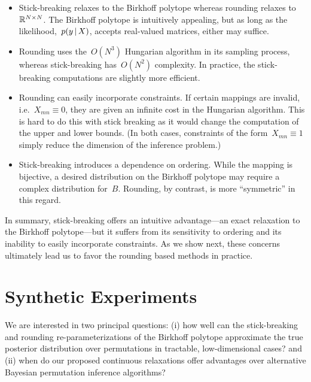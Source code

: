 \documentclass[twoside]{article}
\begin{document}
\begin{itemize}
\item Stick-breaking relaxes to the Birkhoff polytope whereas rounding
  relaxes to~$\mathbb{R}^{N \times N}$. The Birkhoff polytope is
  intuitively appealing, but as long as the
  likelihood,~$p(y \, | \, X)$, accepts real-valued matrices, either
  may suffice.
  
\item Rounding uses the~$O(N^3)$ Hungarian algorithm in its sampling
  process, whereas stick-breaking has~$O(N^2)$ complexity. In practice,
  the stick-breaking computations are slightly more efficient.
    
\item Rounding can easily incorporate constraints.  If certain
  mappings are invalid, i.e.~${X_{mn} \equiv 0}$, they are given an
  infinite cost in the Hungarian algorithm. This is hard to do this
  with stick breaking as it would change the computation of the upper
  and lower bounds. (In both cases, constraints of the
  form~$X_{mn} \equiv 1$ simply reduce the dimension of the inference
  problem.)
  
\item Stick-breaking introduces a dependence on ordering.  While the
  mapping is bijective, a desired distribution on the Birkhoff polytope
  may require a complex distribution for~$B$.  Rounding, by contrast,
  is more ``symmetric'' in this regard.
  
\end{itemize}

In summary, stick-breaking offers an intuitive advantage---an exact
relaxation to the Birkhoff polytope---but it suffers from its
sensitivity to ordering and its inability to easily incorporate
constraints.  As we show next, these concerns ultimately lead us to
favor the rounding based methods in practice.

\section{Synthetic Experiments}
\label{sec:synthetic}
We are interested in two principal questions: 
 (i) how well can the stick-breaking and rounding re-parameterizations
of the Birkhoff polytope approximate the true posterior distribution
over permutations in tractable, low-dimensional cases? and (ii)
when do our proposed continuous relaxations offer
advantages over alternative  Bayesian permutation
inference algorithms?

\end{document}

